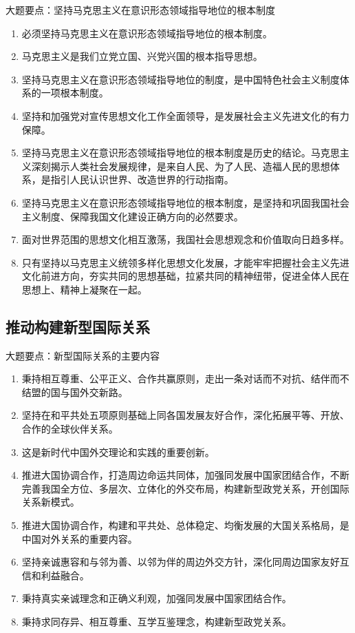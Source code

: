 \documentclass[12pt,a4paper]{ctexart}
\begin{document}
\begin{greenlinebox}{大题要点：坚持马克思主义在意识形态领域指导地位的根本制度}
\begin{enumerate}
  \item 必须坚持马克思主义在意识形态领域指导地位的根本制度。
  \item 马克思主义是我们立党立国、兴党兴国的根本指导思想。
  \item 坚持马克思主义在意识形态领域指导地位的制度，是中国特色社会主义制度体系的一项根本制度。
  \item 坚持和加强党对宣传思想文化工作全面领导，是发展社会主义先进文化的有力保障。
  \item 坚持马克思主义在意识形态领域指导地位的根本制度是历史的结论。马克思主义深刻揭示人类社会发展规律，是来自人民、为了人民、造福人民的思想体系，是指引人民认识世界、改造世界的行动指南。
  \item 坚持马克思主义在意识形态领域指导地位的根本制度，是坚持和巩固我国社会主义制度、保障我国文化建设正确方向的必然要求。
  \item 面对世界范围的思想文化相互激荡，我国社会思想观念和价值取向日趋多样。
  \item 只有坚持以马克思主义统领多样化思想文化发展，才能牢牢把握社会主义先进文化前进方向，夯实共同的思想基础，拉紧共同的精神纽带，促进全体人民在思想上、精神上凝聚在一起。
\end{enumerate}
\end{greenlinebox}

\subsection{推动构建新型国际关系}

\begin{greenlinebox}{大题要点：新型国际关系的主要内容}
\begin{enumerate}
  \item 秉持相互尊重、公平正义、合作共赢原则，走出一条对话而不对抗、结伴而不结盟的国与国外交新路。
  \item 坚持在和平共处五项原则基础上同各国发展友好合作，深化拓展平等、开放、合作的全球伙伴关系。
  \item 这是新时代中国外交理论和实践的重要创新。
  \item 推进大国协调合作，打造周边命运共同体，加强同发展中国家团结合作，不断完善我国全方位、多层次、立体化的外交布局，构建新型政党关系，开创国际关系新模式。
  \item 推进大国协调合作，构建和平共处、总体稳定、均衡发展的大国关系格局，是中国对外关系的重要内容。
  \item 坚持亲诚惠容和与邻为善、以邻为伴的周边外交方针，深化同周边国家友好互信和利益融合。
  \item 秉持真实亲诚理念和正确义利观，加强同发展中国家团结合作。
  \item 秉持求同存异、相互尊重、互学互鉴理念，构建新型政党关系。
\end{enumerate}
\end{greenlinebox}
\end{document}

